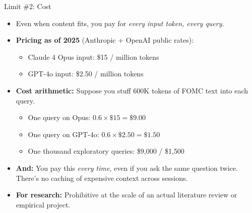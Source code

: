 \documentclass[10pt,english,aspectratio=169]{beamer}
\begin{document}
\begin{frame}{Limit \#2: Cost}
\begin{itemize}
\item Even when content fits, you pay for \emph{every input token, every query.}

\medskip
\item \textbf{Pricing as of 2025} (Anthropic + OpenAI public rates):
\begin{itemize}
    \item Claude 4 Opus input: \$15 / million tokens
    \item GPT-4o input: \$2.50 / million tokens
\end{itemize}

\medskip
\item \textbf{Cost arithmetic:} Suppose you stuff 600K tokens of FOMC text into each query.
\begin{itemize}
    \item One query on Opus: $0.6 \times \$15 = \$9.00$
    \item One query on GPT-4o: $0.6 \times \$2.50 = \$1.50$
    \item One thousand exploratory queries: \$9{,}000 / \$1{,}500
\end{itemize}

\medskip
\item \textbf{And:} You pay this \emph{every time}, even if you ask the same question twice. There's no caching of expensive context across sessions.

\medskip
\item \textbf{For research:} Prohibitive at the scale of an actual literature review or empirical project.
\end{itemize}
\end{frame}
\end{document}
